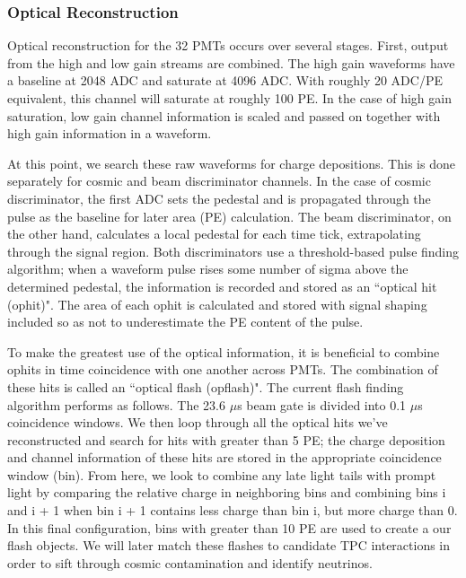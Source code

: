\subsubsection{Optical Reconstruction} 
Optical reconstruction for the 32 PMTs occurs over several stages. First, output from the high and low gain streams are combined.  The high gain waveforms have a baseline at 2048 ADC and saturate at 4096 ADC.  With roughly 20 ADC/PE equivalent, this channel will saturate at roughly 100 PE.  In the case of high gain saturation, low gain channel information is scaled and passed on together with high gain information in a waveform. 


\par At this point, we search these raw waveforms for charge depositions.  This is done separately for cosmic and beam discriminator channels. In the case of cosmic discriminator, the first ADC sets the pedestal and is propagated through the pulse as the baseline for later area (PE) calculation. The beam discriminator, on the other hand, calculates a local pedestal for each time tick, extrapolating through the signal region. Both discriminators use a threshold-based pulse finding algorithm; when a waveform pulse rises some number of sigma above the determined pedestal, the information is recorded and stored as an ``optical hit (ophit)".  The area of each ophit is calculated and stored with signal shaping included so as not to underestimate the PE content of the pulse.
\par To make the greatest use of the optical information, it is beneficial to combine ophits in time coincidence with one another across PMTs.  The combination of these hits is called an ``optical flash (opflash)".  The current flash finding algorithm performs as follows. The 23.6 $\mu$s beam gate is divided into 0.1 $\mu$s coincidence windows. We then loop through all the optical hits we've reconstructed and search for hits with greater than 5 PE; the charge deposition and channel information of these hits are stored in the appropriate coincidence window (bin).  From here, we look to combine any late light tails with prompt light by comparing the relative charge in neighboring bins and combining bins i and i + 1 when bin i + 1 contains less charge than bin i, but more charge than 0.  In this final configuration, bins with greater than 10 PE are used to create a our flash objects.  We will later match these flashes to candidate TPC interactions in order to sift through cosmic contamination and identify neutrinos. 

